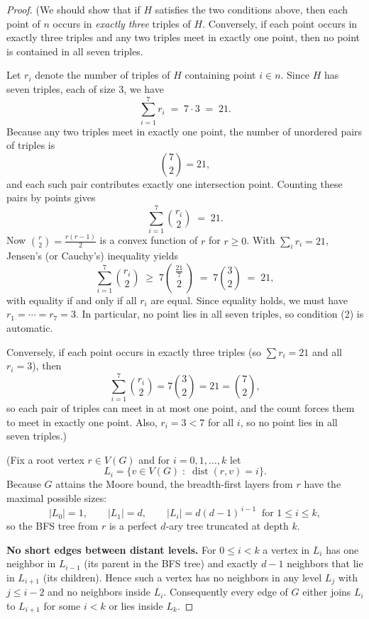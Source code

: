 \documentclass[12pt,a4paper,openany]{book}
\begin{document}
\begin{proof}
(We should show that if $H$ satisfies the two conditions above, then each point of $n$ occurs in
\emph{exactly three} triples of $H$. Conversely, if each point occurs in exactly three triples
and any two triples meet in exactly one point, then no point is contained in all seven triples.


Let $r_i$ denote the number of triples of $H$ containing point $i\in n$.
Since $H$ has seven triples, each of size $3$, we have
\[
\sum_{i=1}^7 r_i \;=\; 7\cdot 3 \;=\; 21.
\]
Because any two triples meet in exactly one point, the number of unordered pairs
of triples is
\[
\binom{7}{2}=21,
\]
and each such pair contributes exactly one intersection point. Counting these
pairs by points gives
\[
\sum_{i=1}^7 \binom{r_i}{2} \;=\; 21.
\]
Now $\binom{r}{2}=\frac{r(r-1)}{2}$ is a convex function of $r$ for $r\ge 0$.
With $\sum_i r_i=21$, Jensen’s (or Cauchy’s) inequality yields
\[
\sum_{i=1}^7 \binom{r_i}{2} \;\ge\; 7\binom{\,\frac{21}{7}\,}{2}
\;=\; 7\binom{3}{2} \;=\; 21,
\]
with equality if and only if all $r_i$ are equal. Since equality holds, we must have
$r_1=\cdots=r_7=3$. In particular, no point lies in all seven triples, so condition (2) is automatic.

Conversely, if each point occurs in exactly three triples (so $\sum r_i=21$ and all $r_i=3$),
then
\[
\sum_{i=1}^7 \binom{r_i}{2} = 7\binom{3}{2} = 21 = \binom{7}{2},
\]
so each pair of triples can meet in at most one point, and the count forces them
to meet in exactly one point. Also, $r_i=3<7$ for all $i$, so no point lies in all seven triples.)

(Fix a root vertex \(r\in V(G)\) and for \(i=0,1,\dots,k\) let
\[
L_i=\{v\in V(G)\;:\;\operatorname{dist}(r,v)=i\}.
\]
Because \(G\) attains the Moore bound, the breadth-first layers from \(r\) have the maximal possible sizes:
\[
|L_0|=1,\qquad |L_1|=d,\qquad |L_i|=d(d-1)^{\,i-1}\ \text{ for }1\le i\le k,
\]
so the BFS tree from \(r\) is a perfect \(d\)-ary tree truncated at depth \(k\).

\medskip

\textbf{No short edges between distant levels.} For \(0\le i<k\) a vertex in \(L_i\) has one neighbor in \(L_{i-1}\) (its parent in the BFS tree) and exactly \(d-1\) neighbors that lie in \(L_{i+1}\) (its children). Hence such a vertex has no neighbors in any level \(L_j\) with \(j\le i-2\) and no neighbors inside \(L_i\). Consequently every edge of \(G\) either joins \(L_i\) to \(L_{i+1}\) for some \(i<k\) or lies inside \(L_k\).


\end{proof}
\end{document}
